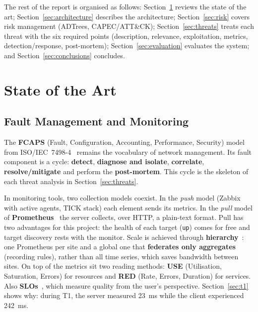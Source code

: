 \documentclass[11pt,a4paper]{article}
\begin{document}
The rest of the report is organised as follows: Section~\ref{sec:soa} reviews the state of
the art; Section~\ref{sec:architecture} describes the architecture;
Section~\ref{sec:risk} covers risk management (ADTrees, CAPEC/ATT\&CK);
Section~\ref{sec:threats} treats each threat with the six required points (description,
relevance, exploitation, metrics, detection/response, post-mortem);
Section~\ref{sec:evaluation} evaluates the system; and
Section~\ref{sec:conclusions} concludes.


\section{State of the Art}
\label{sec:soa}

\subsection{Fault Management and Monitoring}

\begin{sloppypar}
The \textbf{FCAPS} (Fault, Configuration, Accounting, Performance,
Security) model from ISO/IEC~7498-4~\cite{iso7498} remains the vocabulary of
network management. Its fault component is a cycle: \textbf{detect},
\textbf{diagnose and isolate}, \textbf{correlate}, \textbf{resolve/mitigate}
and perform the \textbf{post-mortem}. This cycle is the skeleton of each threat
analysis in Section~\ref{sec:threats}.
\end{sloppypar}

In monitoring tools, two collection models coexist. In the \emph{push} model (Zabbix with
active agents, TICK stack) each element sends its metrics. In the \emph{pull} model of
\textbf{Prometheus}~\cite{brazil2018} the server collects, over HTTP, a plain-text format.
Pull has two advantages for this project: the health of each target (\texttt{up}) comes for
free and target discovery rests with the monitor. Scale is achieved through
\textbf{hierarchy}~\cite{prometheus2024}: one Prometheus per site and a global one that
\textbf{federates only aggregates} (recording rules), rather than all time series, which
saves bandwidth between sites. On top of the metrics sit two reading methods: \textbf{USE} (Utilisation, Saturation,
Errors) for resources and \textbf{RED} (Rate, Errors, Duration) for services. Also
\textbf{SLOs}~\cite{sre2016}, which measure quality from the user's perspective.
Section~\ref{sec:t1} shows why: during T1, the server measured 23~ms while the client
experienced 242~ms.
\end{document}
